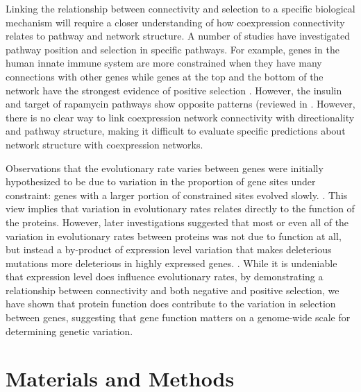 Linking the relationship between connectivity and selection to a specific biological mechanism will require a closer understanding of how coexpression connectivity relates to pathway and network structure. A number of studies have investigated pathway position and selection in specific pathways. For example, genes in the human innate immune system are more constrained when they have many connections with other genes while genes at the top and the bottom of the network have the strongest evidence of positive selection \citep{Casals2011-jz}. However, the insulin and target of rapamycin pathways show opposite patterns (reviewed in \citep{Olson-Manning2013-op}. However, there is no clear way to link coexpression network connectivity with directionality and pathway structure, making it difficult to evaluate specific predictions about network structure with coexpression networks.

Observations that the evolutionary rate varies between genes were initially hypothesized to be due to variation in the proportion of gene sites under constraint: genes with a larger portion of constrained sites evolved slowly. \citep{Kimura1977-ib}. This view implies that variation in evolutionary rates relates directly to the function of the proteins. However, later investigations suggested that most or even all of the variation in evolutionary rates between proteins was not due to function at all, but instead a by-product of expression level variation that makes deleterious mutations more deleterious in highly expressed genes. \citep{Drummond2006-pa,Zhang2015-ne}. While it is undeniable that expression level does influence evolutionary rates, by demonstrating a relationship between connectivity and both negative and positive selection, we have shown that protein function does contribute to the variation in selection between genes, suggesting that gene function matters on a genome-wide scale for determining genetic variation. 


\section{Materials and Methods}

